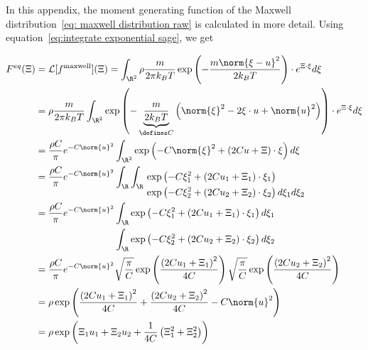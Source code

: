 In this appendix, the moment generating function of the Maxwell distribution~\eqref{eq: maxwell distribution raw} is calculated in more detail.
Using equation~\eqref{eq:integrate exponential sage}, we get

\begin{equation}
  \begin{aligned}
    F^{eq}(\Xi) & = \mathcal{L}[f^{\text{maxwell}}](\Xi)
    = \int_{\R^2} \rho \frac{m}{2\pi k_B T} \exp \left( - \frac{m\norm{\xi-u}^2}{2 k_B T}\right) \cdot e^{\Xi\cdot\xi} d\xi \\
    & = \rho  \frac{m}{2\pi k_B T} \int_{\R^2}
      \exp \left( - \underbrace{\frac{m}{2 k_B T}}_{\defines C} \left( \norm{\xi}^2 - 2\xi\cdot u + \norm{u}^2 \right)\right) \cdot e^{\Xi\cdot\xi} d\xi \\
    & = \frac{\rho C} {\pi} e^{-C \norm{u}^2}
      \int_{\R^2}
      \exp \left( - C\norm{\xi}^2 + (2Cu + \Xi)\cdot\xi \right) d\xi \\
    & =  \frac{\rho C} {\pi} e^{-C \norm{u}^2}
      \int_{\R} \int_{\R}
      \begin{aligned}[t]
      &\exp \left( - C \xi_1^2 + (2Cu_1 + \Xi_1)\cdot\xi_1 \right) \\
      &\exp \left( - C\xi_2^2 + (2Cu_2 + \Xi_2)\cdot\xi_2 \right) d\xi_1 d\xi_2
      \end{aligned}\\
    & = \frac{\rho C} {\pi} e^{-C \norm{u}^2}
      \begin{aligned}[t]
        &\int_{\R}
        \exp \left( - C\xi_1^2 + (2Cu_1 + \Xi_1)\cdot\xi_1 \right) d\xi_1 \\
        &\int_{\R}
        \exp \left( - C\xi_2^2 + (2Cu_2 + \Xi_2)\cdot\xi_2 \right) d\xi_2
      \end{aligned}\\
    & = \frac{\rho C} {\pi} e^{-C \norm{u}^2}
      \sqrt{\frac{\pi}{C}}\exp \left( \frac{{(2Cu_1 + \Xi_1)}^2}{4C}\right)
      \sqrt{\frac{\pi}{C}}\exp \left( \frac{{(2Cu_2 + \Xi_2)}^2}{4C}\right) \\
    & = \rho
      \exp \left( \frac{{(2Cu_1 + \Xi_1)}^2}{4C} + \frac{{(2Cu_2 + \Xi_2)}^2}{4C} -C \norm{u}^2 \right) \\
    & = \rho
      \exp \left( \Xi_1 u_1 + \Xi_2 u_2 + \frac{1}{4C}\left(\Xi_1^2 + \Xi_2^2 \right)\right)
  \end{aligned}
\end{equation}
